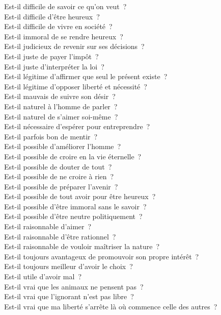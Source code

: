 \documentclass[a4paper,12pt]{article}
\begin{document}
Est-il difficile de savoir ce qu'on veut ? \\
Est-il difficile d'être heureux ? \\
Est-il difficile de vivre en société ? \\
Est-il immoral de se rendre heureux ? \\
Est-il judicieux de revenir sur ses décisions ? \\
Est-il juste de payer l'impôt ? \\
Est-il juste d'interpréter la loi ? \\
Est-il légitime d'affirmer que seul le présent existe ? \\
Est-il légitime d'opposer liberté et nécessité ? \\
Est-il mauvais de suivre son désir ? \\
Est-il naturel à l'homme de parler ? \\
Est-il naturel de s'aimer soi-même ? \\
Est-il nécessaire d'espérer pour entreprendre ? \\
Est-il parfois bon de mentir ? \\
Est-il possible d'améliorer l'homme ? \\
Est-il possible de croire en la vie éternelle ? \\
Est-il possible de douter de tout ? \\
Est-il possible de ne croire à rien ? \\
Est-il possible de préparer l'avenir ? \\
Est-il possible de tout avoir pour être heureux ? \\
Est-il possible d'être immoral sans le savoir ? \\
Est-il possible d'être neutre politiquement ? \\
Est-il raisonnable d'aimer ? \\
Est-il raisonnable d'être rationnel ? \\
Est-il raisonnable de vouloir maîtriser la nature ? \\
Est-il toujours avantageux de promouvoir son propre intérêt ? \\
Est-il toujours meilleur d'avoir le choix ? \\
Est-il utile d'avoir mal ? \\
Est-il vrai que les animaux ne pensent pas ? \\
Est-il vrai que l'ignorant n'est pas libre ? \\
Est-il vrai que ma liberté s'arrête là où commence celle des autres ? \\
\end{document}
